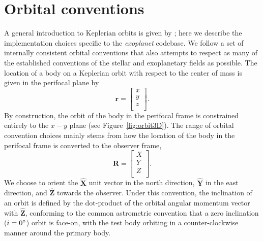 \documentclass[modern]{aastex62}
\begin{document}
\section{Orbital conventions}
A general introduction to Keplerian orbits is given by \citet{Murray:2010}; here we describe the implementation choices specific to the \emph{exoplanet} codebase.
We follow a set of internally consistent orbital conventions that also attempts to respect as many of the established conventions of the stellar and exoplanetary fields as possible. The location of a body on a Keplerian orbit with respect to the center of mass is given in the perifocal plane by
\begin{equation}
  \boldsymbol{r} =
  \left [
    \begin{array}{c}
      x\\
      y\\
      z\\
    \end{array}
  \right ].
\end{equation}
By construction, the orbit of the body in the perifocal frame is constrained entirely to the $x -y$ plane (see Figure~\ref{fig:orbit3D}). The range of orbital convention choices mainly stems from how the location of the body in the perifocal frame is converted to the observer frame,
\begin{equation}
  \boldsymbol{R} =
  \left [
    \begin{array}{c}
      X\\
      Y\\
      Z\\
    \end{array}
  \right ].
\end{equation}
We choose to orient the $\hat{\boldsymbol{X}}$ unit vector in the north direction, $\hat{\boldsymbol{Y}}$ in the east direction, and $\hat{\boldsymbol{Z}}$ towards the observer. Under this convention, the inclination of an orbit is defined by the dot-product of the orbital angular momentum vector with $\hat{\boldsymbol{Z}}$, conforming to the common astrometric convention that a zero inclination ($i = 0\mbox{$^\circ$}$) orbit is face-on, with the test body orbiting in a counter-clockwise manner around the primary body.
\end{document}
